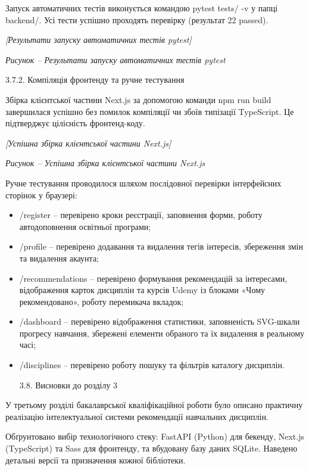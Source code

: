 \documentclass[
]{article}
\begin{document}
Запуск автоматичних тестів виконується командою pytest tests/ -v у папці
backend/. Усі тести успішно проходять перевірку (результат 22 passed).

\emph{{[}Результати запуску автоматичних тестів pytest{]}}

\emph{Рисунок -- Результати запуску автоматичних тестів pytest}

3.7.2. Компіляція фронтенду та ручне тестування

Збірка клієнтської частини Next.js за допомогою команди npm run build
завершилася успішно без помилок компіляції чи збоїв типізації
TypeScript. Це підтверджує цілісність фронтенд-коду.

\emph{{[}Успішна збірка клієнтської частини Next.js{]}}

\emph{Рисунок -- Успішна збірка клієнтської частини Next.js}

Ручне тестування проводилося шляхом послідовної перевірки інтерфейсних
сторінок у браузері:

\begin{itemize}
\item
  /register -- перевірено кроки реєстрації, заповнення форми, роботу
  автодоповнення освітньої програми;
\item
  /profile -- перевірено додавання та видалення тегів інтересів,
  збереження змін та видалення акаунта;
\item
  /recommendations -- перевірено формування рекомендацій за інтересами,
  відображення карток дисциплін та курсів Udemy із блоками «Чому
  рекомендовано», роботу перемикача вкладок;
\item
  /dashboard -- перевірено відображення статистики, заповненість
  SVG-шкали прогресу навчання, збережені елементи обраного та їх
  видалення в реальному часі;
\item
  /disciplines -- перевірено роботу пошуку та фільтрів каталогу
  дисциплін.

  \protect{}\label{_Toc230434103}{}3.8. Висновки до розділу
  3
\end{itemize}

У третьому розділі бакалаврської кваліфікаційної роботи було описано
практичну реалізацію інтелектуальної системи рекомендації навчальних
дисциплін.

Обґрунтовано вибір технологічного стеку: FastAPI (Python) для бекенду,
Next.js (TypeScript) та Sass для фронтенду, та вбудовану базу даних
SQLite. Наведено детальні версії та призначення кожної бібліотеки.
\end{document}
